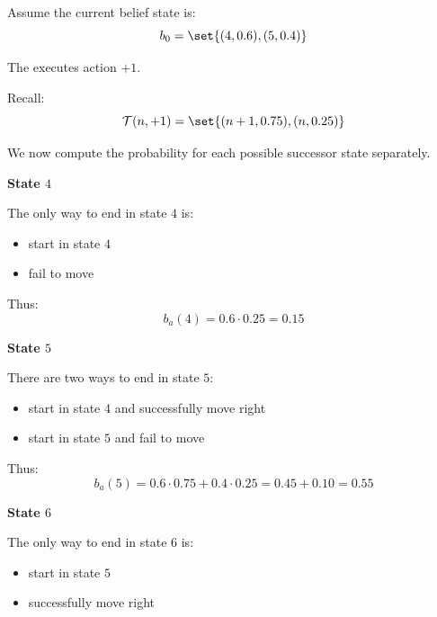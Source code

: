 


Assume the current belief state is:
\[
b_0=\set{(4,0.6),(5,0.4)}
\]

The  executes action $+1$.

Recall:
\[
\mathcal{T}(n,+1)
=
\set{
(n+1,0.75),
(n,0.25)
}
\]

We now compute the probability for each possible successor state separately.


\textbf{State $4$}

The only way to end in state $4$ is:
\begin{itemize}
    \item start in state $4$
    \item fail to move
\end{itemize}

Thus:
\[
b_a(4)
=
0.6\cdot 0.25
=
0.15
\]

\textbf{State $5$}

There are two ways to end in state $5$:
\begin{itemize}
    \item start in state $4$ and successfully move right
    \item start in state $5$ and fail to move
\end{itemize}

Thus:
\[
b_a(5)
=
0.6\cdot 0.75
+
0.4\cdot 0.25
=
0.45+0.10
=
0.55
\]

\textbf{State $6$}

The only way to end in state $6$ is:
\begin{itemize}
    \item start in state $5$
    \item successfully move right
\end{itemize}

